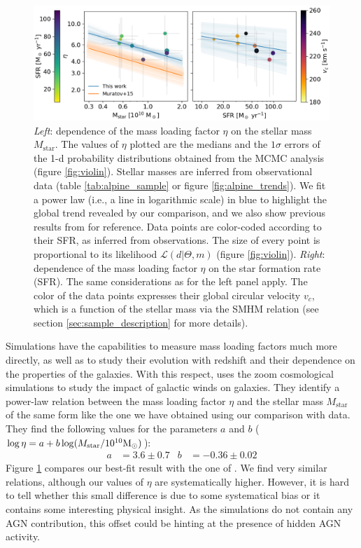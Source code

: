 \begin{figure}
    \centering
    \includegraphics[width=1.0\textwidth]{plots/final_comparison_new.png}
    \caption{\textit{Left}: dependence of the mass loading factor $\eta$ on the stellar mass $M_\mathrm{star}$. The values of $\eta$ plotted are the medians and the $1\sigma$ errors of the 1-d probability distributions obtained from the MCMC analysis (figure \ref{fig:violin}). Stellar masses are inferred from observational data (table \ref{tab:alpine_sample} or figure \ref{fig:alpine_trends}). We fit a power law (i.e., a line in logarithmic scale) in blue to highlight the global trend revealed by our comparison, and we also show previous results from \citet{muratov2015} for reference. Data points are color-coded according to their SFR, as inferred from observations. The size of every point is proportional to its likelihood $\mathcal{L}(d|\Theta,m)$ (figure \ref{fig:violin}). \textit{Right}: dependence of the mass loading factor $\eta$ on the star formation rate (SFR). The same considerations as for the left panel apply. The color of the data points expresses their global circular velocity $v_c$, which is a function of the stellar mass via the SMHM relation (see section \ref{sec:sample_description} for more details). 
    \label{fig:eta_sfr_vc}
    }
\end{figure}


Simulations have the capabilities to measure mass loading factors much more directly, as well as to study their evolution with redshift and their dependence on the properties of the galaxies. With this respect, \citet{muratov2015} uses the  zoom cosmological simulations to study the impact of galactic winds on galaxies. They identify a power-law relation between the mass loading factor $\eta$ and the stellar mass $M_\mathrm{star}$ of the same form like the one we have obtained using our comparison with data. They find the following values for the parameters $a$ and $b$ ($\log \eta = a + b \log( M_\mathrm{star}/10^{10}{\rm M}_{\odot})$):
\begin{align}
    a &= 3.6\pm0.7 & b &= -0.36\pm0.02      
\end{align}
Figure \ref{fig:eta_sfr_vc} compares our best-fit result with the one of \citet{muratov2015}. We find very similar relations, although our values of $\eta$ are systematically higher. However, it is hard to tell whether this small difference is due to some systematical bias or it contains some interesting physical insight. As the  simulations do not contain any AGN contribution, this offset could be hinting at the presence of hidden AGN activity. 

